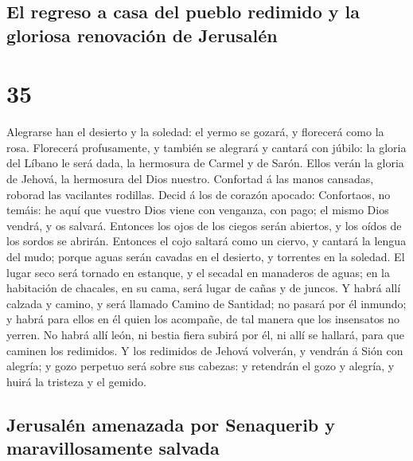 \hypertarget{el-regreso-a-casa-del-pueblo-redimido-y-la-gloriosa-renovaciuxf3n-de-jerusaluxe9n}{%
\subsection{El regreso a casa del pueblo redimido y la gloriosa
renovación de
Jerusalén}\label{el-regreso-a-casa-del-pueblo-redimido-y-la-gloriosa-renovaciuxf3n-de-jerusaluxe9n}}

\hypertarget{section-23-35}{%
\section{35}\label{section-23-35}}

 Alegrarse han el desierto y la soledad: el yermo se
gozará, y florecerá como la rosa.  Florecerá profusamente,
y también se alegrará y cantará con júbilo: la gloria del Líbano le será
dada, la hermosura de Carmel y de Sarón. Ellos verán la gloria de
Jehová, la hermosura del Dios nuestro.  Confortad á las
manos cansadas, roborad las vacilantes rodillas.  Decid á
los de corazón apocado: Confortaos, no temáis: he aquí que vuestro Dios
viene con venganza, con pago; el mismo Dios vendrá, y os salvará.
 Entonces los ojos de los ciegos serán abiertos, y los
oídos de los sordos se abrirán.  Entonces el cojo saltará
como un ciervo, y cantará la lengua del mudo; porque aguas serán cavadas
en el desierto, y torrentes en la soledad.  El lugar seco
será tornado en estanque, y el secadal en manaderos de aguas; en la
habitación de chacales, en su cama, será lugar de cañas y de juncos.
 Y habrá allí calzada y camino, y será llamado Camino de
Santidad; no pasará por él inmundo; y habrá para ellos en él quien los
acompañe, de tal manera que los insensatos no yerren.  No
habrá allí león, ni bestia fiera subirá por él, ni allí se hallará, para
que caminen los redimidos.  Y los redimidos de Jehová
volverán, y vendrán á Sión con alegría; y gozo perpetuo será sobre sus
cabezas: y retendrán el gozo y alegría, y huirá la tristeza y el gemido.

\hypertarget{jerusaluxe9n-amenazada-por-senaquerib-y-maravillosamente-salvada}{%
\subsection{Jerusalén amenazada por Senaquerib y maravillosamente
salvada}\label{jerusaluxe9n-amenazada-por-senaquerib-y-maravillosamente-salvada}}


